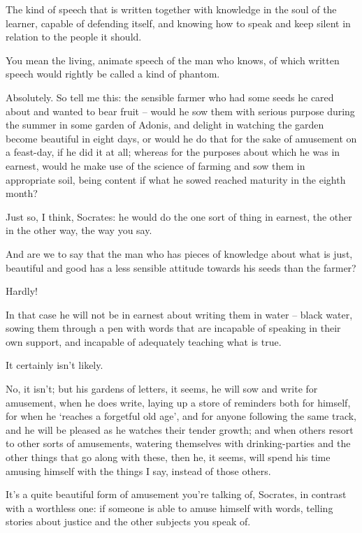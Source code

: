 The kind of speech that is written together with 
knowledge in the soul of the learner, capable of defending itself, and
knowing how to speak and keep silent in relation to the people it
should.

You mean the living,
animate speech of the
man who knows, of which written speech would rightly be called a kind of
phantom.

 Absolutely. So tell me this: the sensible farmer who
had some seeds he cared about and wanted to bear fruit -- would he sow
them with serious purpose during the summer in some garden of
Adonis, and delight in
watching the garden become  beautiful in eight days, or would he
do that for the sake of amusement on a feast-day, if he did it at all;
whereas for the purposes about which he was in earnest, would he make
use of the science of farming and sow them in appropriate soil, being
content if what he sowed reached maturity in the eighth month?

 Just so, I think, Socrates: he would do the one sort
of thing in earnest, the other in the other way, the way you say.

And are we to say that the man who has pieces of
knowledge about what is
just, beautiful and good
has a  less sensible attitude towards his seeds than the farmer?

Hardly!

In that case he will not be in earnest about writing them in
water -- black water, sowing them through a pen with words that are
incapable of speaking in their own support, and incapable of adequately
teaching what is true.

 It certainly isn't likely.

 No, it isn't; but his gardens of letters, it seems, he
will sow and write for amusement, when he does write, laying up a store
of reminders both for himself, for when he ‘reaches a forgetful old
age', and for anyone
following the same track,  and he will be pleased as he watches
their tender growth; and when others resort to other sorts of
amusements, watering themselves with drinking-parties and the other
things that go along with these, then he, it seems, will spend his time
amusing himself with the things I say, instead of those others.

 It's a quite beautiful form of amusement you're
talking of, Socrates, in contrast with a worthless one: if someone is
able to amuse himself with words, telling stories about justice and the
other subjects you speak
of.

